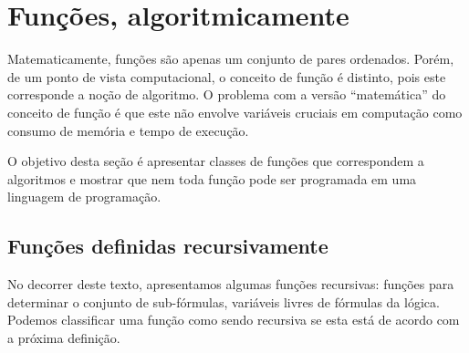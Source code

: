 \section{Funções, algoritmicamente}

Matematicamente, funções são apenas um conjunto de pares
ordenados. Porém, de um ponto de vista computacional, o conceito de
função é distinto, pois este corresponde a noção de algoritmo. O
problema com a versão ``matemática'' do conceito de função é que este
não envolve variáveis cruciais em computação como consumo de memória e
tempo de execução.

O objetivo desta seção é apresentar classes de funções que
correspondem a algoritmos e mostrar que nem toda função pode ser
programada em uma linguagem de programação.

\subsection{Funções definidas recursivamente}

No decorrer deste texto, apresentamos algumas funções recursivas:
funções para determinar o conjunto de sub-fórmulas, variáveis livres
de fórmulas da lógica. Podemos classificar uma função como sendo
recursiva se esta está de acordo com a próxima definição.

